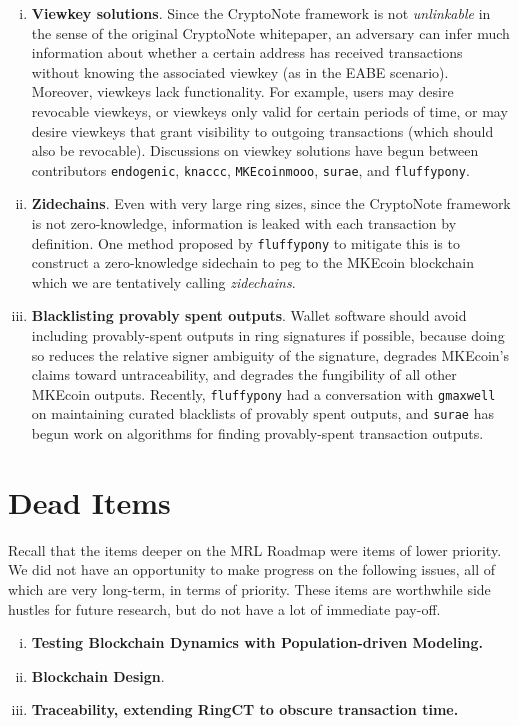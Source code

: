 \documentclass[12pt,english]{mrl}
\theoremstyle{definition}
\numberwithin{equation}{section}
\numberwithin{figure}{section}
\numberwithin{equation}{section}
\numberwithin{equation}{section}
\numberwithin{figure}{section}
\begin{document}
\begin{enumerate}[i.]
\item \textbf{Viewkey solutions}. Since the CryptoNote framework is not \emph{unlinkable} in the sense of the original CryptoNote whitepaper, an adversary can infer much information about whether a certain address has received transactions without knowing the associated viewkey (as in the EABE scenario). Moreover, viewkeys lack functionality. For example, users may desire revocable viewkeys, or viewkeys only valid for certain periods of time, or may desire viewkeys that grant visibility to outgoing transactions (which should also be revocable). Discussions on viewkey solutions have begun between contributors \texttt{endogenic}, \texttt{knaccc}, \texttt{MKEcoinmooo}, \texttt{surae}, and  \texttt{fluffypony}.

\item \textbf{Zidechains}. Even with very large ring sizes, since the CryptoNote framework is not zero-knowledge, information is leaked with each transaction by definition. One method proposed by \texttt{fluffypony} to mitigate this is to construct a zero-knowledge sidechain to peg to the MKEcoin blockchain which we are tentatively calling \textit{zidechains}.

\item \textbf{Blacklisting provably spent outputs}. Wallet software should avoid including provably-spent outputs in ring signatures if possible, because doing so reduces the relative signer ambiguity of the signature, degrades MKEcoin's claims toward untraceability, and degrades the fungibility of all other MKEcoin outputs. Recently, \texttt{fluffypony} had a conversation with \texttt{gmaxwell} on maintaining curated blacklists of provably spent outputs, and \texttt{surae} has begun work on algorithms for finding provably-spent transaction outputs.
\end{enumerate}


\section{Dead Items}

Recall that the items deeper on the MRL Roadmap were items of lower priority. We did not have an opportunity to make progress on the following issues, all of which are very long-term, in terms of priority. These items are worthwhile side hustles for future research, but do not have a lot of immediate pay-off.

\begin{enumerate}[i.]
    \item \textbf{Testing Blockchain Dynamics with Population-driven Modeling.} 
    
    \item \textbf{Blockchain Design}.
    
    \item \textbf{Traceability, extending RingCT to obscure transaction time.}
\end{enumerate}
\end{document}
